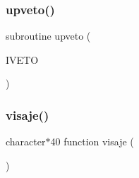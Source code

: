 \subsubsection{\texorpdfstring{upveto()}{upveto()}}
{\footnotesize\ttfamily subroutine upveto (\begin{DoxyParamCaption}\item[{}]{I\+V\+E\+TO }\end{DoxyParamCaption})}

\mbox{\label{pythia-6_84_824_8f_a86533917dbffaccdf34edd0843bb7dcb}} 
\subsubsection{\texorpdfstring{visaje()}{visaje()}}
{\footnotesize\ttfamily character$\ast$40 function visaje (\begin{DoxyParamCaption}{ }\end{DoxyParamCaption})}

